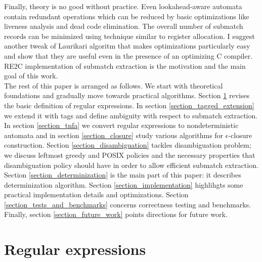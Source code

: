 \documentclass{article}
\theoremstyle{definition}
\begin{document}
\begin{multicols}{2}
Finally, theory is no good without practice.
Even lookahead-aware automata contain redundant operations
which can be reduced by basic optimizations like liveness analysis and dead code elimination.
The overall number of submatch records can be minimized using technique similar to register allocation.
I suggest another tweak of Laurikari algoritm that makes optimizations particularly easy
and show that they are useful even in the presence of an optimizing C compiler.
RE2C implementation of submatch extraction is the motivation and the main goal of this work.
\\

The rest of this paper is arranged as follows.
We start with theoretical foundations and gradually move towards practical algorithms.
Section \ref{section_regular_expressions} revises the basic definition of regular expressions.
In section \ref{section_tagged_extension} we extend it with tags
and define ambiguity with respect to submatch extraction.
In section \ref{section_tnfa} we convert regular expressions to nondeterministic automata
and in section \ref{section_closure} study various algorithms for $\epsilon$-closure construction.
Section \ref{section_disambiguation} tackles disambiguation problem;
we discuss leftmost greedy and POSIX policies and the necessary properties that disambiguation policy should have in order to allow efficient submatch extraction.
Section \ref{section_determinization} is the main part of this paper: it describes determinization algorithm.
Section \ref{section_implementation} highlihgts some practical implementation details and optimizations.
Section \ref{section_tests_and_benchmarks} concerns correctness testing and benchmarks.
Finally, section \ref{section_future_work} points directions for future work.

\section{Regular expressions}\label{section_regular_expressions}


\end{multicols}
\end{document}
